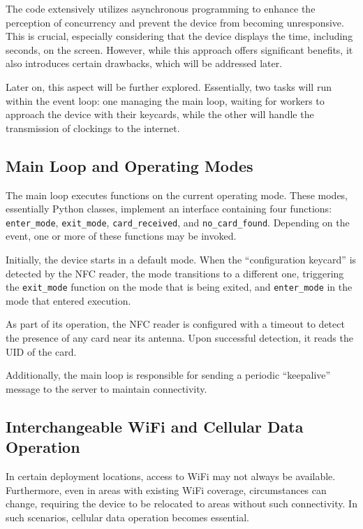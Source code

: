 The code extensively utilizes asynchronous programming to enhance the perception of concurrency 
and prevent the device from becoming unresponsive. This is crucial, especially considering that the 
device displays the time, including seconds, on the screen. However, while this approach offers 
significant benefits, it also introduces certain drawbacks, which will be addressed later.

Later on, this aspect will be further explored. Essentially, two tasks will run within the event 
loop: one managing the main loop, waiting for workers to approach the device with their keycards, 
while the other will handle the transmission of clockings to the internet.

\subsection{Main Loop and Operating Modes}

The main loop executes functions on the current operating mode. These modes, essentially Python 
classes, implement an interface containing four functions:\\ \texttt{enter\_mode}, 
\texttt{exit\_mode}, \texttt{card\_received}, and \texttt{no\_card\_found}. Depending on the event, 
one or more of these functions may be invoked.

Initially, the device starts in a default mode. When the ``configuration keycard'' is detected by 
the NFC reader, the mode transitions to a different one, triggering the \texttt{exit\_mode} 
function on the mode that is being exited, and \texttt{enter\_mode} in the mode that entered 
execution.

As part of its operation, the NFC reader is configured with a timeout to detect the presence of any 
card near its antenna. Upon successful detection, it reads the UID of the card.

Additionally, the main loop is responsible for sending a periodic ``keepalive'' message to the 
server to maintain connectivity.

\subsection{Interchangeable WiFi and Cellular Data Operation}

In certain deployment locations, access to WiFi may not always be available. Furthermore, even in 
areas with existing WiFi coverage, circumstances can change, requiring the device to be relocated 
to areas without such connectivity. In such scenarios, cellular data operation becomes essential.

